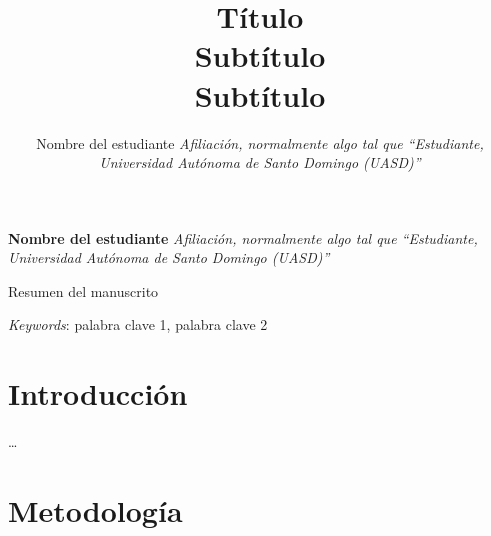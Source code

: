 \documentclass[11pt,]{article}
\title{Título\\
Subtítulo\\
Subtítulo  }
\author{\Large Nombre del
estudiante\vspace{0.05in} \newline\normalsize\emph{Afiliación,
normalmente algo tal que ``Estudiante, Universidad Autónoma de Santo
Domingo (UASD)''}  }
\date{}
\newcommand*{\authorfont}{\fontfamily{phv}\selectfont}
\renewenvironment{abstract}
 {{%
    \setlength{\leftmargin}{0mm}
    \setlength{\rightmargin}{\leftmargin}%
  }%
  \relax}
 {\endlist}
\begin{document}
	
%    


{%
\setlength{\parindent}{0pt}
\thispagestyle{plain}
{\fontsize{18}{20}\selectfont\raggedright 
\maketitle  %

}

{
   \vskip 13.5pt\relax \normalsize\fontsize{11}{12} 
\textbf{\authorfont Nombre del
estudiante} \hskip 15pt \emph{\small Afiliación, normalmente algo tal
que ``Estudiante, Universidad Autónoma de Santo Domingo (UASD)''}   

}

}








\begin{abstract}

    \hbox{\vrule height .2pt width 39.14pc}

    \vskip 8.5pt %

\noindent Resumen del manuscrito


\vskip 8.5pt \noindent \emph{Keywords}: palabra clave 1, palabra clave
2 \par

    \hbox{\vrule height .2pt width 39.14pc}



\end{abstract}


\vskip 6.5pt


\noindent  \hypertarget{introducciuxf3n}{%
\section{Introducción}\label{introducciuxf3n}}

\ldots

\hypertarget{metodologuxeda}{%
\section{Metodología}\label{metodologuxeda}}
\end{document}
